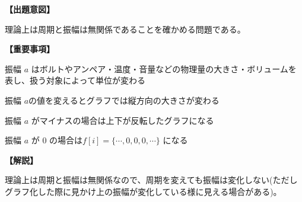 \noindent \textbf{【出題意図】}

\noindent 理論上は周期と振幅は無関係であることを確かめる問題である。

\vspace{1em}
\noindent \textbf{【重要事項】}

\bigskip
\noindent\quad 振幅 $a$ はボルトやアンペア・温度・音量などの物理量の大きさ・ボリュームを表し、扱う対象によって単位が変わる

\bigskip
\noindent\quad 振幅 $a$の値を変えるとグラフでは縦方向の大きさが変わる

\bigskip
\noindent\quad 振幅 $a$ がマイナスの場合は上下が反転したグラフになる

\bigskip
\noindent\quad 振幅 $a$ が $0$ の場合は$f[i]=\{\cdots,0,0,0,\cdots\}$ になる


\vspace{1em}
\noindent \textbf{【解説】}

\noindent 理論上は周期と振幅は無関係なので、周期を変えても振幅は変化しない(ただしグラフ化した際に見かけ上の振幅が変化している様に見える場合がある)。
